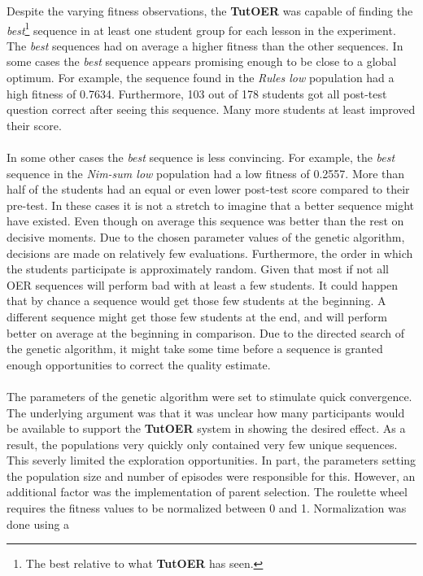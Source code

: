 \noindent
Despite the varying fitness observations, the \textbf{TutOER} was capable of
finding the \emph{best}\footnote{The best relative to what \textbf{TutOER} has
seen.} sequence in at least one student group for each lesson in the
experiment. The \emph{best} sequences had on average a higher fitness than the other
sequences. In some cases the \emph{best} sequence appears promising enough to be close
to a global optimum. For example, the sequence found in the \emph{Rules low}
population had a high fitness of 0.7634. Furthermore, 103 out of 178 students
got all post-test question correct after seeing this sequence. Many more
students at least improved their score.\\\\
\noindent
In some other cases the \emph{best} sequence is less convincing. For example,
the \emph{best} sequence in the \emph{Nim-sum low} population had a low fitness of
0.2557. More than half of the students had an equal or even lower post-test
score compared to their pre-test. In these cases it is not a stretch to imagine
that a better sequence might have existed. Even though on average this sequence
was better than the rest on decisive moments. Due to the chosen parameter
values of the genetic algorithm, decisions are made on relatively few
evaluations. Furthermore, the order in which the students participate is
approximately random. Given that most if not all OER sequences will perform bad
with at least a few students. It could happen that by chance a sequence would get those
few students at the beginning. A different sequence might get those few
students at the end, and will perform better on average at the beginning in
comparison. Due to the directed search of the genetic algorithm, it might take
some time before a sequence is granted enough opportunities to correct the
quality estimate.\\\\
\noindent
The parameters of the genetic algorithm were set to stimulate quick
convergence. The underlying argument was that it was unclear how many
participants would be available to support the \textbf{TutOER} system in
showing the desired effect. As a result, the populations very quickly only
contained very few unique sequences. This severly limited the exploration
opportunities. In part, the parameters setting the population size and number
of episodes were responsible for this. However, an additional factor was the
implementation of parent selection. The roulette wheel requires the fitness
values to be normalized between 0 and 1. Normalization was done using a
